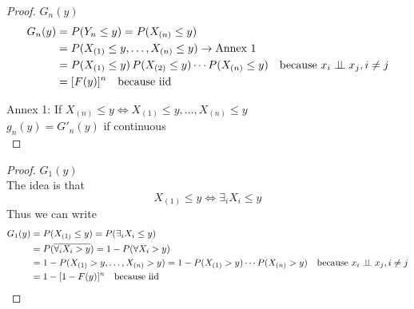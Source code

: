 \begin{proof}
    $G_n(y)$
    \begin{align*}
        G_n(y) & = P(Y_n\leq y) = P(X_{(n)}\leq y)\\
        & = P(X_{(1)}\leq y,\ldots, X_{(n)}\leq y) \to \text{Annex 1}\\
        & = P(X_{(1)}\leq y)\,P(X_{(2)}\leq y)\cdots P(X_{(n)}\leq y)\quad \text{because }x_i\perp\!\!\!\perp x_j, i\neq j\\
        & = [F(y)]^n\quad \text{because iid}
    \end{align*}

    Annex 1: If $X_{(n)}\leq y\Leftrightarrow X_{(1)}\leq y,\ldots, X_{(n)}\leq y$\\

    $g_n(y) = G'_n(y)$ if continuous\\
\end{proof}
\begin{proof}
    $G_1(y)$\\

    The idea is that
    \begin{equation*}
        X_{(1)}\leq y \Leftrightarrow \exists_i X_i \leq y
    \end{equation*}
    Thus we can write
    \begin{align*}
        G_1(y) & = P(X_{(1)}\leq y) = P(\exists_i X_i\leq y)\\
        & = P(\overline{\forall_i X_i>y}) = 1-P(\forall X_i>y)\\
        & = 1 - P(X_{(1)}>y, \ldots, X_{(n)}>y) = 1 - P(X_{(1)}>y)\cdots P(X_{(n)}>y) \quad \text{because }x_i\perp\!\!\!\perp x_j, i\neq j\\
        & = 1 - [1-F(y)]^n \quad \text{because iid}
    \end{align*}
\end{proof}

